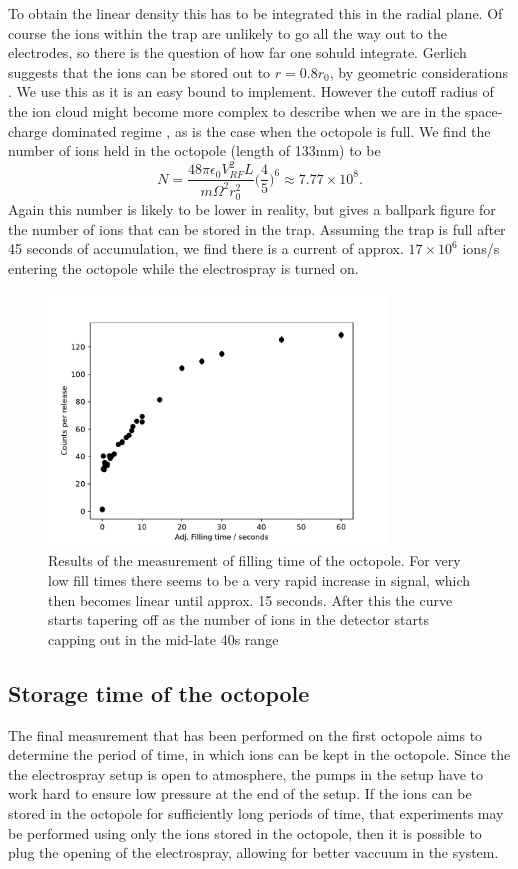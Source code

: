 To obtain the linear density this has to be integrated this in the radial plane.
Of course the ions within the trap are unlikely to go all the way out to the electrodes, so there is the question of how far one sohuld integrate. Gerlich suggests that the ions can be stored out to $r = 0.8r_0$, by geometric considerations \cite{Gerlich1992}. We use this as it is an easy bound to implement. However the cutoff radius of the ion cloud might become more complex to describe when we are in the 
space-charge dominated regime \cite{MajimaDensity}, as is the case when the octopole is full. We find the number of ions held in the octopole (length of 133mm) to be
\begin{equation}
    N = \frac{48\pi\epsilon_0V_{RF}^2L}{m\Omega^2r_0^2}\bigg(\frac{4}{5}\bigg)^6\approx 7.77\times 10^8.
\end{equation}
Again this number is likely to be lower in reality, but gives a ballpark figure for the number of ions that can be stored in the trap. Assuming the trap is full after 45 seconds of accumulation, we find there is a current of approx. $17\times 10^6$ ions/s entering the octopole while the electrospray is turned on.


\begin{figure}
    \centering
    \includegraphics[width = 0.8\textwidth]{main/FillingTimeGraph.pdf}
    \caption{Results of the measurement of filling time of the octopole. For very low fill times there seems to be a very rapid increase in signal, which then becomes linear until approx. 15 seconds. After this the curve starts tapering off as the number of ions in the detector starts capping out in the mid-late 40s range}
    \label{fig:fillTimeGraph}
\end{figure}
\subsection{Storage time of the octopole}
The final measurement that has been performed on the first octopole aims to determine the period of time, in which ions can be kept in the octopole. Since the the electrospray setup is open to atmosphere, the pumps in the setup have to work hard to ensure low pressure at the end of the setup.
If the ions can be stored in the octopole for sufficiently long periods of time, that experiments may be performed using only the ions stored in the octopole, then it is possible to plug the opening of the electrospray, allowing for better vaccuum in the system.

